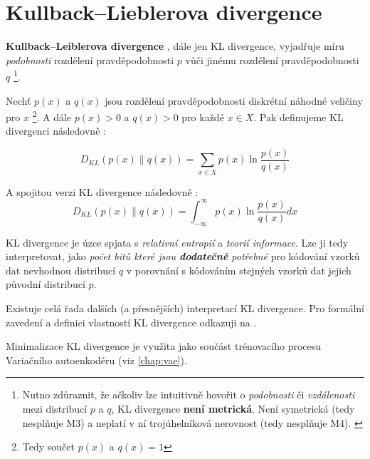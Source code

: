 \section{Kullback–Lieblerova divergence}
\label{sec:kl_divergence}

\textbf{Kullback–Leiblerova divergence} \cite{Kullback1951}, dále jen KL divergence, vyjadřuje míru \emph{podobnosti} rozdělení pravděpodobnosti $p$ vůči jinému rozdělení pravděpodobnosti $q$
\footnote{Nutno zdůraznit, že ačkoliv lze intuitivně hovořit o \emph{podobnosti} či \emph{vzdálenosti} mezi distribucí $p$ a $q$, KL divergence \textbf{není metrická}. Není symetrická (tedy nesplňuje M3) a neplatí v ní trojúhelníková nerovnost (tedy nesplňuje M4). \cite{Phillips2021}}.


Nechť $p(x)$ a $q(x)$ jsou rozdělení pravděpodobnosti diskrétní náhodné veličiny pro $x$
\footnote{Tedy součet $p(x)$ a $q(x) = 1$}.
A dále $p(x) > 0$ a $q(x) > 0$ pro každé $x \in X$. Pak definujeme KL divergenci následovně \cite{Murphy2022}:

\begin{equation}
    D_{KL}(p(x) \| q(x)) = \sum_{x \in X}^{}p(x)\ln{\frac{p(x)}{q(x)}}
\end{equation}

A spojitou verzi KL divergence následovně \cite{Murphy2022}:
\begin{equation}
    D_{KL}(p(x) \| q(x)) = \int_{-\infty}^{\infty}p(x)\ln{\frac{p(x)}{q(x)}}dx 
\end{equation}

KL divergence je úzce spjata s \emph{relativní entropií} a \emph{teorií informace}.
Lze ji tedy interpretovat, jako \emph{počet bitů které jsou \textbf{dodatečně} potřebné} pro kódování vzorků dat nevhodnou distribucí $q$ v porovnání s kódováním stejných vzorků dat jejich původní distribucí $p$.

Existuje celá řada dalších (a přesnějších) interpretací KL divergence. Pro formální zavedení a definici vlastností KL divergence odkazuji na \cite[kap. 5.1]{Murphy2023}.

Minimalizace KL divergence je využita jako součást trénovacího procesu Variačního autoenkodéru (viz \autoref{chap:vae}).
